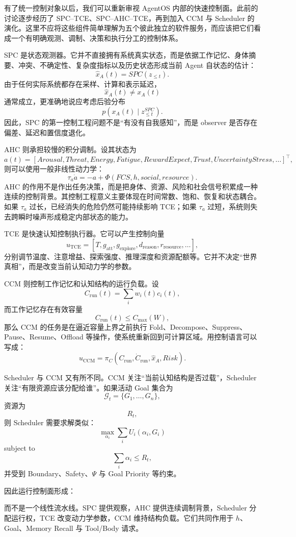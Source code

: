 有了统一控制对象以后，我们可以重新审视 AgentOS 内部的快速控制面。此前的讨论逐步经历了 SPC--TCE、SPC--AHC--TCE，再到加入 CCM 与 Scheduler 的演化。这里不应将这些组件简单理解为五个彼此独立的软件服务，而应该把它们看成一个有明确观测、调制、决策和执行分工的控制体系。

SPC 是状态观测器。它并不直接拥有系统真实状态，而是依据工作记忆、身体摘要、冲突、不确定性、复杂度指标以及历史状态形成当前 Agent 自状态的估计：
\[
\hat x_A(t)
=
SPC(
z_{\le t}
).
\]
由于任何实际系统都存在采样、计算和表示延迟，
\[
\hat x_A(t)
\neq
x_A(t)
\]
通常成立，更准确地说应考虑后验分布
\[
p(
x_A(t)
\mid
z_{\le t}^{SPC}
).
\]
因此，SPC 的第一控制工程问题不是“有没有自我感知”，而是 observer 是否存在偏差、延迟和置信度退化。

AHC 则承担较慢的积分调制。设其状态为
\[
a(t)
=
[
Arousal,
Threat,
Energy,
Fatigue,
RewardExpect,
Trust,
UncertaintyStress,\ldots
]^\top,
\]
则可以使用一般非线性动力学：
\[
\tau_a\dot a
=
-a
+
\Phi(
FCS,
h,
social,
resource
).
\]
AHC 的作用不是作出任务决策，而是把身体、资源、风险和社会信号积累成一种连续的控制背景。其控制工程意义主要体现在时间常数、饱和、恢复和状态耦合。如果 $\tau_a$ 过长，已经消失的危险仍然可能持续影响 TCE；如果 $\tau_a$ 过短，系统则失去跨瞬时噪声形成稳定内部状态的能力。

TCE 是快速认知控制执行器。它可以产生控制向量
\[
u_{\mathrm{TCE}}
=
[
T,
g_{\mathrm{att}},
g_{\mathrm{explore}},
d_{\mathrm{reason}},
r_{\mathrm{resource}},
\ldots
],
\]
分别调节温度、注意增益、探索强度、推理深度和资源配额等。它并不决定“世界真相”，而是改变当前认知动力学的参数。

CCM 则控制工作记忆和认知结构的运行负载。设
\[
C_{\mathrm{run}}(t)
=
\sum_i
w_i(t)c_i(t),
\]
而工作记忆存在有效容量
\[
C_{\mathrm{run}}(t)
\le
C_{\max}(W),
\]
那么 CCM 的任务是在逼近容量上界之前执行 Fold、Decompose、Suppress、Pause、Resume、Offload 等操作，使系统重新回到可计算区域。用控制语言可以写成：
\[
u_{\mathrm{CCM}}
=
\pi_C(
C_{\mathrm{run}},
\dot C_{\mathrm{run}},
\hat x_A,
Risk
).
\]

Scheduler 与 CCM 又有所不同。CCM 关注“当前认知结构是否过载”，Scheduler 关注“有限资源应该分配给谁”。如果活动 Goal 集合为
\[
\mathcal G_t=\{G_1,\ldots,G_n\},
\]
资源为
\[
R_t,
\]
则 Scheduler 需要求解类似：
\[
\max_{\alpha_i}
\sum_i
U_i(\alpha_i,G_i)
\]
subject to
\[
\sum_i\alpha_i
\le
R_t,
\]
并受到 Boundary、Safety、$\Psi$ 与 Goal Priority 等约束。

因此运行控制面形成：
\begin{statementbox}
\centering
{}
\end{statementbox}
而不是一个线性流水线。SPC 提供观察，AHC 提供连续调制背景，Scheduler 分配运行权，TCE 改变动力学参数，CCM 维持结构负载。它们共同作用于 $h$、Goal、Memory Recall 与 Tool/Body 请求。


